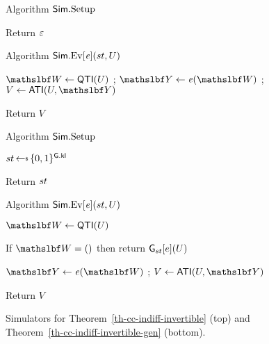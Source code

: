 \begin{figure}[t]
	\begin{twoCols}{0.25}{0.6}{
			\begin{algorithm}{Algorithm $\mathsf{Sim}.{\mathrm{Setup}}$}
				\item Return $\varepsilon$
			\end{algorithm}
		}
		{
			\begin{algorithm}{Algorithm $\mathsf{Sim}.{\mathrm{Ev}}[\mathit{e}](st,U)$}
				\item $\vecW\gets\QuTInv(U)$ ; $\vecY \gets \aFunc{\functionOut}(\vecW)$ ; $V\gets\AnTInv(U,\vecY)$
				\item Return $V$ \smallskip
			\end{algorithm}
		}
	\end{twoCols}
	\begin{twoCols}{0.25}{0.6}{
			\begin{algorithm}{Algorithm $\mathsf{Sim}.{\mathrm{Setup}}$}
				\item $\commoncoins \getsr \bits^{\prfKl}$
				\item Return $st$
			\end{algorithm}
		}
		{
			\begin{algorithm}{Algorithm $\mathsf{Sim}.{\mathrm{Ev}}[\mathit{e}](st,U)$}
				\item $\vecW\gets\QuTInv(U)$
				\item If $\vecW=()$ then return $\mathsf{G}_{st}[{e}](U)$
				\item $\vecY \gets \aFunc{\functionOut}(\vecW)$ ; $V\gets\AnTInv(U,\vecY)$
				\item Return $V$
			\end{algorithm}\smallskip
		}
	\end{twoCols}
	\caption{Simulators for Theorem~\ref{th-cc-indiff-invertible} (top) and Theorem~\ref{th-cc-indiff-invertible-gen} (bottom).}
	\label{fig-th-cc-indiff-invertible}
	\label{fig:cc-indiff-sims}
\end{figure}

